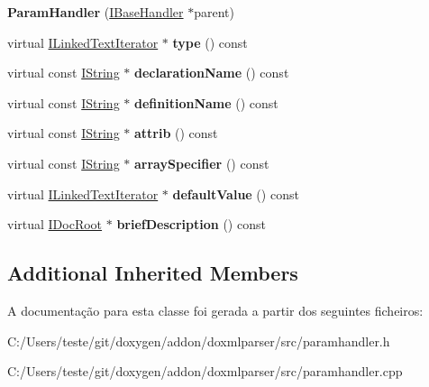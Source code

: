 \begin{DoxyCompactItemize}
\item 
\hypertarget{class_param_handler_aaacbb92783bff2b91fcbaee822783954}{{\bfseries Param\-Handler} (\hyperlink{class_i_base_handler}{I\-Base\-Handler} $\ast$parent)}\label{class_param_handler_aaacbb92783bff2b91fcbaee822783954}

\item 
\hypertarget{class_param_handler_a7c773516fe041391bb91401006470799}{virtual \hyperlink{class_i_linked_text_iterator}{I\-Linked\-Text\-Iterator} $\ast$ {\bfseries type} () const }\label{class_param_handler_a7c773516fe041391bb91401006470799}

\item 
\hypertarget{class_param_handler_a78e76a32c7911af2382806a7c04d34c4}{virtual const \hyperlink{class_i_string}{I\-String} $\ast$ {\bfseries declaration\-Name} () const }\label{class_param_handler_a78e76a32c7911af2382806a7c04d34c4}

\item 
\hypertarget{class_param_handler_a234305bb1b95a2289a943b9feaaa6418}{virtual const \hyperlink{class_i_string}{I\-String} $\ast$ {\bfseries definition\-Name} () const }\label{class_param_handler_a234305bb1b95a2289a943b9feaaa6418}

\item 
\hypertarget{class_param_handler_a49b289e2b83c398b8df6de60a09294ec}{virtual const \hyperlink{class_i_string}{I\-String} $\ast$ {\bfseries attrib} () const }\label{class_param_handler_a49b289e2b83c398b8df6de60a09294ec}

\item 
\hypertarget{class_param_handler_a7a28ddd5439f94d95e4b9cad2486b666}{virtual const \hyperlink{class_i_string}{I\-String} $\ast$ {\bfseries array\-Specifier} () const }\label{class_param_handler_a7a28ddd5439f94d95e4b9cad2486b666}

\item 
\hypertarget{class_param_handler_ac4e20c752953d775b57043e16909c033}{virtual \hyperlink{class_i_linked_text_iterator}{I\-Linked\-Text\-Iterator} $\ast$ {\bfseries default\-Value} () const }\label{class_param_handler_ac4e20c752953d775b57043e16909c033}

\item 
\hypertarget{class_param_handler_a90d0ec3bda5465dfb8c7b986c9bc2f1f}{virtual \hyperlink{class_i_doc_root}{I\-Doc\-Root} $\ast$ {\bfseries brief\-Description} () const }\label{class_param_handler_a90d0ec3bda5465dfb8c7b986c9bc2f1f}

\end{DoxyCompactItemize}
\subsection*{Additional Inherited Members}


A documentação para esta classe foi gerada a partir dos seguintes ficheiros\-:\begin{DoxyCompactItemize}
\item 
C\-:/\-Users/teste/git/doxygen/addon/doxmlparser/src/paramhandler.\-h\item 
C\-:/\-Users/teste/git/doxygen/addon/doxmlparser/src/paramhandler.\-cpp\end{DoxyCompactItemize}
